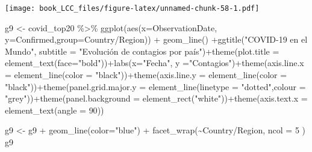 \documentclass[
]{book}
\newenvironment{Shaded}{\begin{snugshade}}{\end{snugshade}}
\newcommand{\AttributeTok}[1]{\textcolor[rgb]{0.77,0.63,0.00}{#1}}
\newcommand{\DecValTok}[1]{\textcolor[rgb]{0.00,0.00,0.81}{#1}}
\newcommand{\FunctionTok}[1]{\textcolor[rgb]{0.00,0.00,0.00}{#1}}
\newcommand{\NormalTok}[1]{#1}
\newcommand{\OtherTok}[1]{\textcolor[rgb]{0.56,0.35,0.01}{#1}}
\newcommand{\SpecialCharTok}[1]{\textcolor[rgb]{0.00,0.00,0.00}{#1}}
\newcommand{\StringTok}[1]{\textcolor[rgb]{0.31,0.60,0.02}{#1}}
\begin{document}
\texttt{[image: book\_LCC\_files/figure-latex/unnamed-chunk-58-1.pdf]}

\begin{Shaded}
\begin{Highlighting}[]
\NormalTok{g9 }\OtherTok{\textless{}{-}}\NormalTok{ covid\_top20 }\SpecialCharTok{\%\textgreater{}\%}
    \FunctionTok{ggplot}\NormalTok{(}\FunctionTok{aes}\NormalTok{(}\AttributeTok{x=}\NormalTok{ObservationDate, }\AttributeTok{y=}\NormalTok{Confirmed,}\AttributeTok{group=}\StringTok{\textasciigrave{}}\AttributeTok{Country/Region}\StringTok{\textasciigrave{}}\NormalTok{)) }\SpecialCharTok{+}  \FunctionTok{geom\_line}\NormalTok{() }\SpecialCharTok{+}\FunctionTok{ggtitle}\NormalTok{(}\StringTok{"COVID{-}19 en el Mundo"}\NormalTok{, }\AttributeTok{subtitle =} \StringTok{"Evolución de contagios por país"}\NormalTok{)}\SpecialCharTok{+}\FunctionTok{theme}\NormalTok{(}\AttributeTok{plot.title =} \FunctionTok{element\_text}\NormalTok{(}\AttributeTok{face=}\StringTok{"bold"}\NormalTok{))}\SpecialCharTok{+}\FunctionTok{labs}\NormalTok{(}\AttributeTok{x=}\StringTok{"Fecha"}\NormalTok{, }\AttributeTok{y =}\StringTok{"Contagios"}\NormalTok{)}\SpecialCharTok{+}\FunctionTok{theme}\NormalTok{(}\AttributeTok{axis.line.x =} \FunctionTok{element\_line}\NormalTok{(}\AttributeTok{color =} \StringTok{"black"}\NormalTok{))}\SpecialCharTok{+}\FunctionTok{theme}\NormalTok{(}\AttributeTok{axis.line.y =} \FunctionTok{element\_line}\NormalTok{(}\AttributeTok{color =} \StringTok{"black"}\NormalTok{))}\SpecialCharTok{+}\FunctionTok{theme}\NormalTok{(}\AttributeTok{panel.grid.major.y =} \FunctionTok{element\_line}\NormalTok{(}\AttributeTok{linetype =} \StringTok{"dotted"}\NormalTok{,}\AttributeTok{colour =} \StringTok{"grey"}\NormalTok{))}\SpecialCharTok{+}\FunctionTok{theme}\NormalTok{(}\AttributeTok{panel.background =} \FunctionTok{element\_rect}\NormalTok{(}\StringTok{"white"}\NormalTok{))}\SpecialCharTok{+}\FunctionTok{theme}\NormalTok{(}\AttributeTok{axis.text.x =} \FunctionTok{element\_text}\NormalTok{(}\AttributeTok{angle =} \DecValTok{90}\NormalTok{))}

\NormalTok{g9 }\OtherTok{\textless{}{-}}\NormalTok{ g9 }\SpecialCharTok{+} \FunctionTok{geom\_line}\NormalTok{(}\AttributeTok{color=}\StringTok{"blue"}\NormalTok{) }\SpecialCharTok{+} \FunctionTok{facet\_wrap}\NormalTok{(}\SpecialCharTok{\textasciitilde{}}\StringTok{\textasciigrave{}}\AttributeTok{Country/Region}\StringTok{\textasciigrave{}}\NormalTok{, }\AttributeTok{ncol =} \DecValTok{5}\NormalTok{ )}
\NormalTok{g9}
\end{Highlighting}
\end{Shaded}
\end{document}
